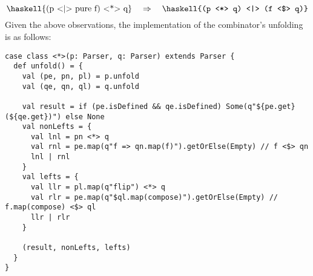 \documentclass[../../main.tex]{subfiles}
\begin{document}
\begin{equation} \label{eq:ap-leftrec}
\text{\haskell{(p <|> pure f) <*> q}} \quad \Rightarrow \quad \text{\haskell{(p <*> q) <|> (f <$> q)}}
\vspace{3ex} %
\end{equation}
%
Given the above observations, the implementation of the \scala{<*>} combinator's unfolding is as follows:
\begin{verbatim}
case class <*>(p: Parser, q: Parser) extends Parser {
  def unfold() = {
    val (pe, pn, pl) = p.unfold
    val (qe, qn, ql) = q.unfold

    val result = if (pe.isDefined && qe.isDefined) Some(q"${pe.get}(${qe.get})") else None
    val nonLefts = {
      val lnl = pn <*> q
      val rnl = pe.map(q"f => qn.map(f)").getOrElse(Empty) // f <$> qn
      lnl | rnl
    }
    val lefts = {
      val llr = pl.map(q"flip") <*> q
      val rlr = pe.map(q"$ql.map(compose)").getOrElse(Empty) // f.map(compose) <$> ql
      llr | rlr
    }

    (result, nonLefts, lefts)
  }
}
\end{verbatim}
\end{document}

